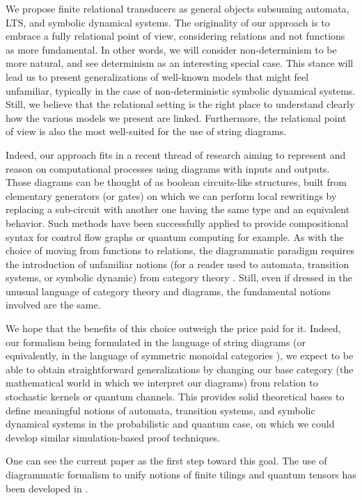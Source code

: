 We propose finite relational transducers as general objects subsuming automata, LTS, and symbolic dynamical systems. 
The originality of our approach is to embrace a fully relational point of view, considering relations and not functions as more fundamental. 
In other words, we will consider non-determinism to be more natural, and see determinism as an interesting special case. 
This stance will lead us to present generalizations of well-known models that might feel unfamiliar, typically in the case of non-deterministic symbolic dynamical systems. 
Still, we believe that the relational setting is the right place to understand clearly how the various models we present are linked.
Furthermore, the relational point of view is also the most well-suited for the use of string diagrams.

Indeed, our approach fits in a recent thread of research aiming to represent and reason on computational processes using diagrams with inputs and outputs.
Those diagrams can be thought of as boolean circuits-like structures, built from elementary generators (or gates) on which we can perform local rewritings by replacing a sub-circuit with another one having the same type and an equivalent behavior. Such methods have been successfully applied to provide compositional syntax for control flow graphs \cite{bonchi2014categorical,bonchi2021survey} or quantum computing \cite{van2020zx} for example.
%
As with the choice of moving from functions to relations, the diagrammatic paradigm requires the introduction of unfamiliar notions (for a reader used to automata, transition systems, or symbolic dynamic) from category theory \cite{selinger2011survey}.
Still, even if dressed in the unusual language of category theory and diagrams, the fundamental notions involved are the same.

We hope that the benefits of this choice outweigh the price paid for it.
Indeed, our formalism being formulated in the language of string diagrams (or equivalently, in the language of symmetric monoidal categories \cite{MacLane}), we expect to be able to obtain straightforward generalizations by changing our base category (the mathematical world in which we interpret our diagrams) from relation to stochastic kernels or quantum channels. 
This provides solid theoretical bases to define meaningful notions of automata, transition systems, and symbolic dynamical systems in the probabilistic and quantum case, on which we could develop similar simulation-based proof techniques. 


One can see the current paper as the first step toward this goal. The use of diagrammatic formalism to unify notions of finite tilings and quantum tensors has been developed in \cite{quantumWang}.

